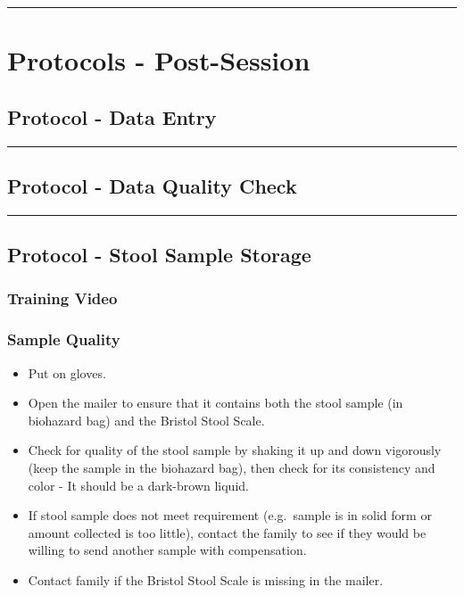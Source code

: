 \documentclass[]{book}
\providecommand{\tightlist}{%
  \setlength{\itemsep}{0pt}\setlength{\parskip}{0pt}}
\begin{document}
\begin{center}\rule{0.5\linewidth}{0.5pt}\end{center}

\hypertarget{protocols---post-session}{%
\section{Protocols - Post-Session}\label{protocols---post-session}}

\hypertarget{protocol---data-entry}{%
\subsection{Protocol - Data Entry}\label{protocol---data-entry}}

\begin{center}\rule{0.5\linewidth}{0.5pt}\end{center}

\hypertarget{protocol---data-quality-check}{%
\subsection{Protocol - Data Quality Check}\label{protocol---data-quality-check}}

\begin{center}\rule{0.5\linewidth}{0.5pt}\end{center}

\hypertarget{protocol---stool-sample-storage}{%
\subsection{Protocol - Stool Sample Storage}\label{protocol---stool-sample-storage}}

\hypertarget{training-video-1}{%
\subsubsection{Training Video}\label{training-video-1}}

\hypertarget{sample-quality}{%
\subsubsection{Sample Quality}\label{sample-quality}}

\begin{itemize}
\tightlist
\item
  Put on gloves.
\item
  Open the mailer to ensure that it contains both the stool sample (in biohazard bag) and the Bristol Stool Scale.
\item
  Check for quality of the stool sample by shaking it up and down vigorously (keep the sample in the biohazard bag), then check for its consistency and color - It should be a dark-brown liquid.
\item
  If stool sample does not meet requirement (e.g.~sample is in solid form or amount collected is too little), contact the family to see if they would be willing to send another sample with compensation.
\item
  Contact family if the Bristol Stool Scale is missing in the mailer.
\end{itemize}
\end{document}
